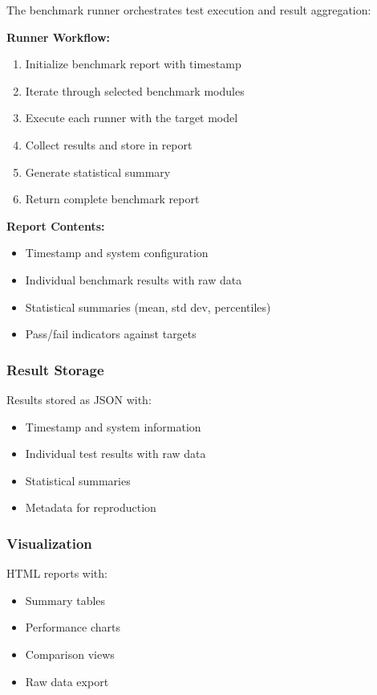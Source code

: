 The benchmark runner orchestrates test execution and result aggregation:

\textbf{Runner Workflow:}
\begin{enumerate}
    \item Initialize benchmark report with timestamp
    \item Iterate through selected benchmark modules
    \item Execute each runner with the target model
    \item Collect results and store in report
    \item Generate statistical summary
    \item Return complete benchmark report
\end{enumerate}

\textbf{Report Contents:}
\begin{itemize}
    \item Timestamp and system configuration
    \item Individual benchmark results with raw data
    \item Statistical summaries (mean, std dev, percentiles)
    \item Pass/fail indicators against targets
\end{itemize}

\subsubsection{Result Storage}

Results stored as JSON with:

\begin{itemize}
    \item Timestamp and system information
    \item Individual test results with raw data
    \item Statistical summaries
    \item Metadata for reproduction
\end{itemize}

\subsubsection{Visualization}

HTML reports with:

\begin{itemize}
    \item Summary tables
    \item Performance charts
    \item Comparison views
    \item Raw data export
\end{itemize}

